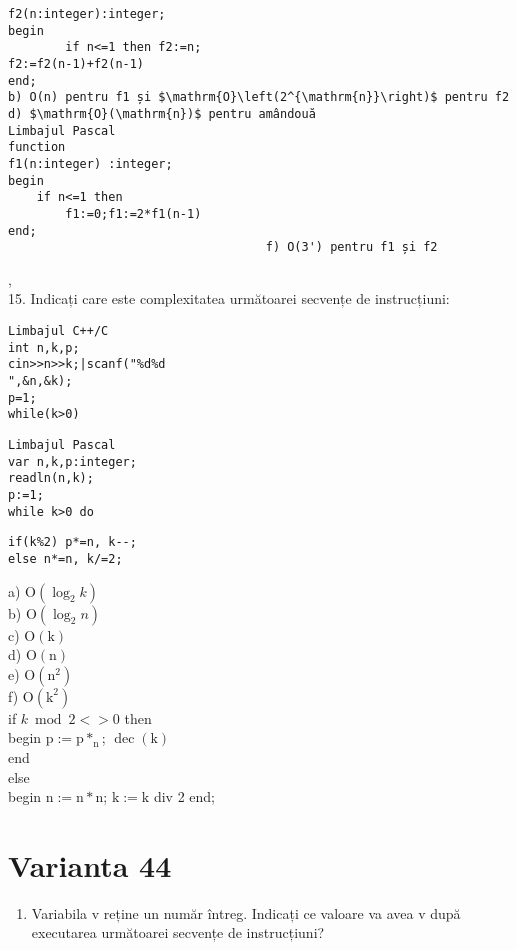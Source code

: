 \begin{verbatim}
f2(n:integer):integer;
begin
        if n<=1 then f2:=n;
f2:=f2(n-1)+f2(n-1)
end;
b) O(n) pentru f1 și $\mathrm{O}\left(2^{\mathrm{n}}\right)$ pentru f2
d) $\mathrm{O}(\mathrm{n})$ pentru amândouă
Limbajul Pascal
function
f1(n:integer) :integer;
begin
    if n<=1 then
        f1:=0;f1:=2*f1(n-1)
end;
                                    f) O(3') pentru f1 și f2
\end{verbatim}

,\\
$\qquad$\\
$\qquad$\\
$\qquad$\\
15. Indicați care este complexitatea următoarei secvențe de instrucțiuni:

\begin{verbatim}
Limbajul C++/C
int n,k,p;
cin>>n>>k;|scanf("%d%d
",&n,&k);
p=1;
while(k>0)
\end{verbatim}

\begin{verbatim}
Limbajul Pascal
var n,k,p:integer;
readln(n,k);
p:=1;
while k>0 do
\end{verbatim}

\begin{verbatim}
if(k%2) p*=n, k--;
else n*=n, k/=2;
\end{verbatim}

a) $\mathrm{O}\left(\log _{2} k\right)$\\
b) $\mathrm{O}\left(\log _{2} n\right)$\\
c) $\mathrm{O}(\mathrm{k})$\\
d) $\mathrm{O}(\mathrm{n})$\\
e) $\mathrm{O}\left(\mathrm{n}^{2}\right)$\\
f) $\mathrm{O}\left(\mathrm{k}^{2}\right)$\\
if $k \bmod 2<>0$ then\\
begin $\mathrm{p}:=\mathrm{p} *_{\mathrm{n}}$; $\operatorname{dec}(\mathrm{k})$\\
end\\
else\\
begin $\mathrm{n}:=\mathrm{n} * \mathrm{n}$; $\mathrm{k}:=\mathrm{k}$ div 2 end;

\section*{Varianta 44}
\begin{enumerate}
  \item Variabila v reține un număr întreg. Indicați ce valoare va avea v după executarea următoarei secvențe de instrucțiuni?
\end{enumerate}

